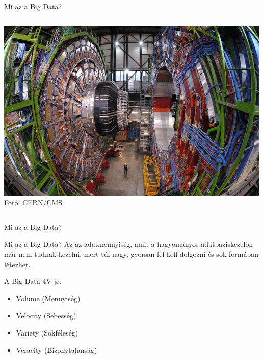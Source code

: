 \begin{frame}{Mi az a Big Data?}
\begin{columns}
\begin{column}{0.5\textwidth}
            \includegraphics[height=0.4\textheight]{figures/cms.jpg} \\ %
            \tiny{Fotó: CERN/CMS}
        \end{column}
    \end{columns}
\end{frame}

\begin{frame}{Mi az a Big Data?}
    \begin{block}{Mi az a Big Data?}
        Az az adatmennyiség, amit a hagyományos adatbáziskezelők már nem tudnak kezelni, mert túl nagy, gyorsan fel kell dolgozni és sok formában létezhet.
    \end{block}
    A Big Data 4V-je:
    \begin{itemize}
        \item Volume (Mennyiség)
        \item Velocity (Sebesség)
        \item Variety (Sokféleség)
        \item Veracity (Bizonytalanság)
    \end{itemize}
\end{frame}

